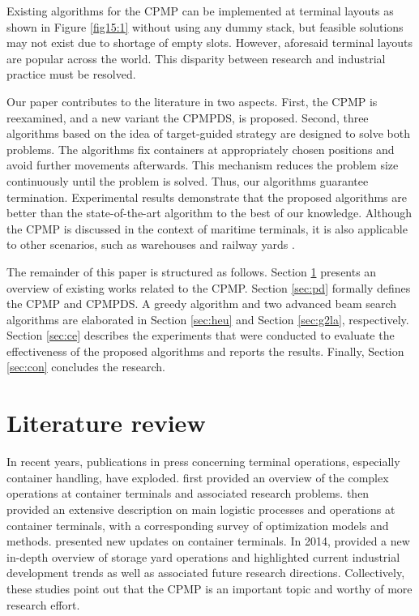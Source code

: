 \documentclass[review,3p,times,authoryear,12pt]{elsarticle}
\begin{document}
Existing algorithms for the CPMP can be implemented at terminal layouts as shown in Figure \ref{fig15:1} without using any dummy stack, but feasible solutions may not exist due to shortage of empty slots.
However, aforesaid terminal layouts are popular across the world.
This disparity between research and industrial practice must be resolved.

Our paper contributes to the literature in two aspects.
First, the CPMP is reexamined, and a new variant the CPMPDS, is proposed.
Second, three algorithms based on the idea of target-guided strategy are designed to solve both problems.
The algorithms fix containers at appropriately chosen positions and avoid further movements afterwards.
This mechanism reduces the problem size continuously until the problem is solved.
Thus, our algorithms guarantee termination.
Experimental results demonstrate that the proposed algorithms are better than the state-of-the-art algorithm to the best of our knowledge.
Although the CPMP is discussed in the context of maritime terminals, it is also applicable to other scenarios, such as warehouses \citep{Muppani2008} and railway yards \citep{Boysen2013}.

The remainder of this paper is structured as follows.
Section \ref{sec:litreview} presents an overview of existing works related to the CPMP.
Section \ref{sec:pd} formally defines the CPMP and CPMPDS.
A greedy algorithm and two advanced beam search algorithms are elaborated in Section \ref{sec:heu} and Section \ref{sec:g2la}, respectively.
Section \ref{sec:ce} describes the experiments that were conducted to evaluate the effectiveness of the proposed algorithms and reports the results.
Finally, Section \ref{sec:con} concludes the research.

\section{Literature review}
\label{sec:litreview}

In recent years, publications in press concerning terminal operations, especially container handling, have exploded.
\cite{Vis2003} first provided an overview of the complex operations at container terminals and associated research problems.
\cite{Steenken2004} then provided an extensive description on main logistic processes and operations at container terminals, with a corresponding survey of optimization models and methods.
\cite{Stahlbock2008} presented new updates on container terminals.
In 2014, \cite{Carlo2014} provided a new in-depth overview of storage yard operations and highlighted current industrial development trends as well as associated future research directions.
Collectively, these studies point out that the CPMP is an important topic and worthy of more research effort.
\end{document}

